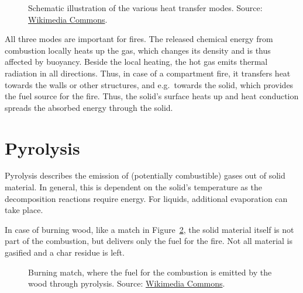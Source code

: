 \documentclass[
  letterpaper,
  DIV=11,
  numbers=noendperiod]{scrreprt}
\begin{document}
\begin{figure}


\caption{\label{fig-heat-transfer-overview}Schematic illustration of the
various heat transfer modes. Source:
\href{https://commons.wikimedia.org/wiki/File:Heat-transmittance-means2.jpg}{Wikimedia
Commons}.}

\end{figure}%

All three modes are important for fires. The released chemical energy
from combustion locally heats up the gas, which changes its density and
is thus affected by buoyancy. Beside the local heating, the hot gas
emits thermal radiation in all directions. Thus, in case of a
compartment fire, it transfers heat towards the walls or other
structures, and e.g.~towards the solid, which provides the fuel source
for the fire. Thus, the solid's surface heats up and heat conduction
spreads the absorbed energy through the solid.

\section{Pyrolysis}\label{pyrolysis}

Pyrolysis describes the emission of (potentially combustible) gases out
of solid material. In general, this is dependent on the solid's
temperature as the decomposition reactions require energy. For liquids,
additional evaporation can take place.

In case of burning wood, like a match in Figure~\ref{fig-burning-match},
the solid material itself is not part of the combustion, but delivers
only the fuel for the fire. Not all material is gasified and a char
residue is left.

\begin{figure}


\caption{\label{fig-burning-match}Burning match, where the fuel for the
combustion is emitted by the wood through pyrolysis. Source:
\href{https://commons.wikimedia.org/wiki/File:Streichholz.JPG}{Wikimedia
Commons}.}

\end{figure}%
\end{document}
